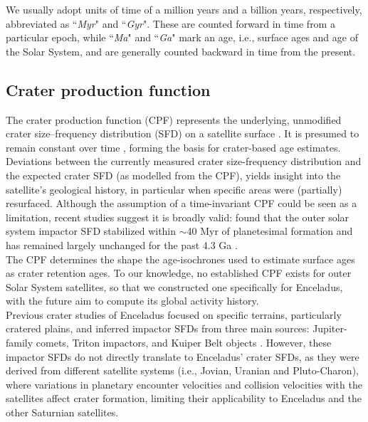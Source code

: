 \documentclass[preprint,11pt,3p,times,authoryear]{elsarticle}
\begin{document}
We usually adopt units of time of a million years and a billion years, respectively, abbreviated as ``{\it Myr}" and ``{\it Gyr}". These are counted forward in time from a particular epoch, while ``{\it Ma}" and ``{\it Ga}" mark an age, i.e., surface ages and age of the Solar System, and are generally counted backward in time from the present.

\subsection{Crater production function}
\label{sub:intro_cpf}
The crater production function (CPF) represents the underlying, unmodified crater size–frequency distribution (SFD) on a satellite surface \citep{Neukum1975}. It is presumed to remain constant over time \citep{Neukum1975,Neukum1983,Werner2014,Werner2023}, forming the basis for crater-based age estimates. Deviations between the currently measured crater size-frequency distribution and the expected crater SFD (as modelled from the CPF), %
yields insight into the satellite's geological history, in particular when specific areas were (partially) resurfaced. Although the assumption of a time-invariant CPF could be seen as a limitation, recent studies suggest it is broadly valid: \citet{Bottke2024} found that the outer solar system impactor SFD stabilized within $\sim$40 Myr of planetesimal formation and has remained largely unchanged for the past 4.3 Ga \citep{Bottke2024}.\\

The CPF determines the shape the age-isochrones used to estimate surface ages as crater retention ages. To our knowledge, no established CPF exists for outer Solar System satellites, so that we constructed one specifically for Enceladus, with the future aim to compute its global activity history. \\

Previous crater studies of Enceladus focused on specific terrains, particularly cratered plains, and inferred impactor SFDs from three main sources: Jupiter-family comets, Triton impactors, and Kuiper Belt objects \citep{Zahnle2003, Singer2019, Bottke2024}. However, these impactor SFDs do not directly translate to Enceladus' crater SFDs, as they  were derived from different satellite systems (i.e., Jovian, Uranian and Pluto-Charon), where variations in planetary encounter velocities and collision velocities with the satellites affect crater formation, limiting their applicability to Enceladus and the other Saturnian satellites. \\
\end{document}
